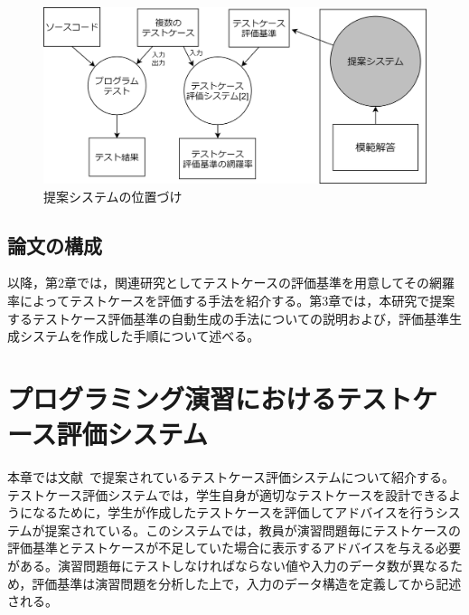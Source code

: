 \documentclass{tpu-sotu}
\begin{document}
\begin{figure}[h]
  \centering
  \includegraphics[width=130mm]{提案システムの位置づけ2.png}
  \caption{提案システムの位置づけ}
  \label{a4}
\end{figure}

\section{論文の構成}
以降，第2章では，関連研究としてテストケースの評価基準を用意してその網羅率によってテストケースを評価する手法を紹介する。第3章では，本研究で提案するテストケース評価基準の自動生成の手法についての説明および，評価基準生成システムを作成した手順について述べる。
\chapter{プログラミング演習におけるテストケース評価システム}
本章では文献~\cite{a1}で提案されているテストケース評価システムについて紹介する。テストケース評価システムでは，学生自身が適切なテストケースを設計できるようになるために，学生が作成したテストケースを評価してアドバイスを行うシステムが提案されている。このシステムでは，教員が演習問題毎にテストケースの評価基準とテストケースが不足していた場合に表示するアドバイスを与える必要がある。演習問題毎にテストしなければならない値や入力のデータ数が異なるため，評価基準は演習問題を分析した上で，入力のデータ構造を定義してから記述される。
\end{document}
